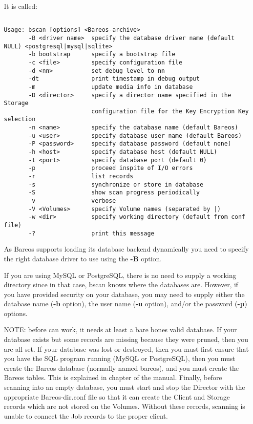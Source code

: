 It is called:

\footnotesize
\begin{verbatim}

Usage: bscan [options] <Bareos-archive>
       -B <driver name>  specify the database driver name (default NULL) <postgresql|mysql|sqlite>
       -b bootstrap      specify a bootstrap file
       -c <file>         specify configuration file
       -d <nn>           set debug level to nn
       -dt               print timestamp in debug output
       -m                update media info in database
       -D <director>     specify a director name specified in the Storage
                         configuration file for the Key Encryption Key selection
       -n <name>         specify the database name (default Bareos)
       -u <user>         specify database user name (default Bareos)
       -P <password>     specify database password (default none)
       -h <host>         specify database host (default NULL)
       -t <port>         specify database port (default 0)
       -p                proceed inspite of I/O errors
       -r                list records
       -s                synchronize or store in database
       -S                show scan progress periodically
       -v                verbose
       -V <Volumes>      specify Volume names (separated by |)
       -w <dir>          specify working directory (default from conf file)
       -?                print this message
\end{verbatim}
\normalsize

As Bareos supports loading its database backend dynamically you need to specify
the right database driver to use using the {\bf -B} option.

If you are using MySQL or PostgreSQL, there is no need to supply a working
directory since in that case, bscan knows where the databases are. However, if
you have provided security on your database, you may need to supply either the
database name ({\bf -b} option), the user name ({\bf -u} option), and/or the
password ({\bf -p}) options.

NOTE: before  can work, it needs at least a bare bones valid
database.  If your database exists but some records are missing because
they were pruned, then you are all set. If your database was lost or
destroyed, then you must first ensure that you have the SQL program running
(MySQL or PostgreSQL), then you must create the Bareos database (normally
named bareos), and you must create the Bareos tables.
This is explained in
 chapter of the manual. Finally, before
scanning into an empty database, you must start and stop the Director with
the appropriate Bareos-dir.conf file so that it can create the Client and
Storage records which are not stored on the Volumes.  Without these
records, scanning is unable to connect the Job records to the proper
client.

